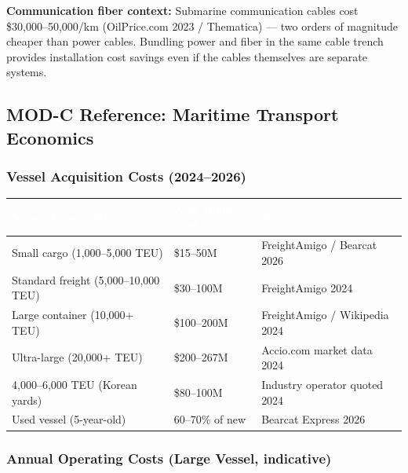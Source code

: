 \documentclass[11pt,letterpaper]{article}
\newcommand{\tableheader}[1]{\textbf{\sffamily\textcolor{white}{#1}}}
\begin{document}
\textbf{Communication fiber context:} Submarine communication cables cost \$30,000--50,000/km
(OilPrice.com 2023 / Thematica) --- two orders of magnitude cheaper than power cables.
Bundling power and fiber in the same cable trench provides installation cost savings even
if the cables themselves are separate systems.

\subsection{MOD-C Reference: Maritime Transport Economics}

\subsubsection{Vessel Acquisition Costs (2024--2026)}

\begin{center}
\begin{tabularx}{\textwidth}{L{4cm}C{3cm}X}
\toprule
{}
\tableheader{Vessel Type / Size} & \tableheader{New Build Cost} & \tableheader{Source} \\
\midrule
Small cargo (1,000--5,000 TEU) & \$15--50M & FreightAmigo / Bearcat 2026 \\
Standard freight (5,000--10,000 TEU) & \$30--100M & FreightAmigo 2024 \\
Large container (10,000+ TEU) & \$100--200M & FreightAmigo / Wikipedia 2024 \\
Ultra-large (20,000+ TEU) & \$200--267M & Accio.com market data 2024 \\
4,000--6,000 TEU (Korean yards) & \$80--100M & Industry operator quoted 2024 \\
Used vessel (5-year-old) & 60--70\% of new & Bearcat Express 2026 \\
\bottomrule
\end{tabularx}
\end{center}

\subsubsection{Annual Operating Costs (Large Vessel, indicative)}
\end{document}
